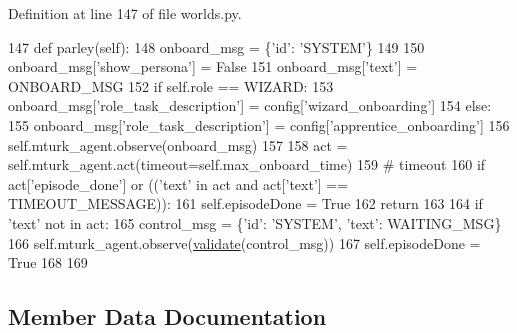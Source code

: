Definition at line 147 of file worlds.\+py.


\begin{DoxyCode}
147     \textcolor{keyword}{def }parley(self):
148         onboard\_msg = \{\textcolor{stringliteral}{'id'}: \textcolor{stringliteral}{'SYSTEM'}\}
149 
150         onboard\_msg[\textcolor{stringliteral}{'show\_persona'}] = \textcolor{keyword}{False}
151         onboard\_msg[\textcolor{stringliteral}{'text'}] = ONBOARD\_MSG
152         \textcolor{keywordflow}{if} self.role == WIZARD:
153             onboard\_msg[\textcolor{stringliteral}{'role\_task\_description'}] = config[\textcolor{stringliteral}{'wizard\_onboarding'}]
154         \textcolor{keywordflow}{else}:
155             onboard\_msg[\textcolor{stringliteral}{'role\_task\_description'}] = config[\textcolor{stringliteral}{'apprentice\_onboarding'}]
156         self.mturk\_agent.observe(onboard\_msg)
157 
158         act = self.mturk\_agent.act(timeout=self.max\_onboard\_time)
159         \textcolor{comment}{# timeout}
160         \textcolor{keywordflow}{if} act[\textcolor{stringliteral}{'episode\_done'}] \textcolor{keywordflow}{or} ((\textcolor{stringliteral}{'text'} \textcolor{keywordflow}{in} act \textcolor{keywordflow}{and} act[\textcolor{stringliteral}{'text'}] == TIMEOUT\_MESSAGE)):
161             self.episodeDone = \textcolor{keyword}{True}
162             \textcolor{keywordflow}{return}
163 
164         \textcolor{keywordflow}{if} \textcolor{stringliteral}{'text'} \textcolor{keywordflow}{not} \textcolor{keywordflow}{in} act:
165             control\_msg = \{\textcolor{stringliteral}{'id'}: \textcolor{stringliteral}{'SYSTEM'}, \textcolor{stringliteral}{'text'}: WAITING\_MSG\}
166             self.mturk\_agent.observe(\hyperlink{namespaceparlai_1_1core_1_1worlds_afc3fad603b7bce41dbdc9cdc04a9c794}{validate}(control\_msg))
167             self.episodeDone = \textcolor{keyword}{True}
168 
169 
\end{DoxyCode}


\subsection{Member Data Documentation}
\mbox{\label{classparlai_1_1mturk_1_1tasks_1_1wizard__of__wikipedia_1_1worlds_1_1RoleOnboardWorld_a37cf10b9e972e9de5dae2191cbe46c2b}} 
